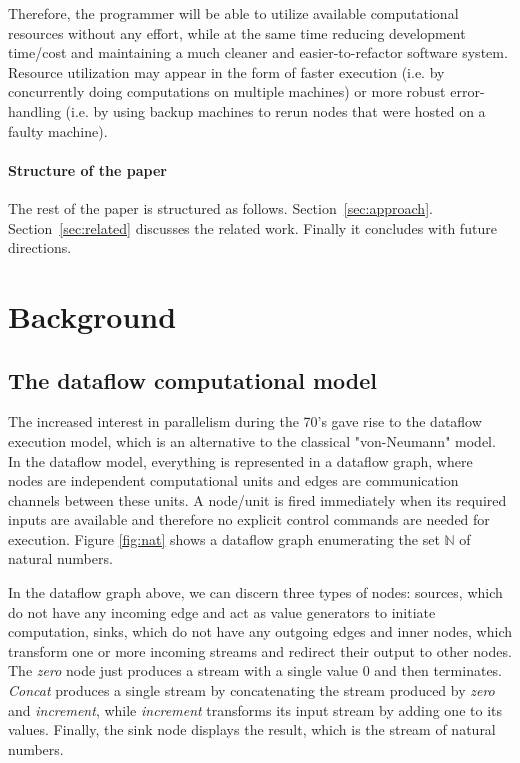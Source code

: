 \documentclass[sigplan,review,anonymous]{acmart}
\begin{document}
Therefore, the programmer will be able to utilize available computational
resources without any effort, while at the same time reducing development
time/cost and maintaining a much cleaner and easier-to-refactor software system.
Resource utilization may appear in the form of faster execution (i.e. by
concurrently doing computations on multiple machines) or more robust
error-handling (i.e. by using backup machines to rerun nodes that were hosted
on a faulty machine).

\paragraph{Structure of the paper}
The rest of the paper is structured as follows. Section~\ref{sec:approach}.
Section~\ref{sec:related} discusses the related work. Finally it concludes
with future directions.

\section{Background} \label{sec:background}

\subsection{The dataflow computational model} The increased interest in
parallelism during the 70's gave rise to the dataflow execution model, which is
an alternative to the classical "von-Neumann" model. In the dataflow model,
everything is represented in a dataflow graph, where nodes are independent
computational units  and edges are communication channels between these units. A
node/unit is fired immediately when its required inputs are available and
therefore no explicit control commands are needed for execution. Figure
\ref{fig:nat} shows a dataflow graph enumerating the set $\mathbb{N}$ of natural
numbers.


In the dataflow graph above, we can discern three types of nodes: sources, which
do not have any incoming edge and act as value generators to initiate
computation, sinks, which do not have any outgoing edges and inner nodes, which
transform one or more incoming streams and redirect their output to other nodes.
The \textit{zero} node just produces a stream with a single value 0 and then
terminates. \textit{Concat} produces a single stream by concatenating the stream
produced by \textit{zero} and \textit{increment}, while \textit{increment}
transforms its input stream by adding one to its values. Finally, the sink node
displays the result, which is the stream of natural numbers.
\end{document}
